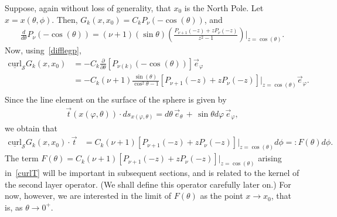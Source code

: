 \documentclass[final]{siamltex}
\newcommand{\C}{C_k}
\renewcommand{\S} {\mathcal{S}}
\begin{document}
Suppose, again without loss of generality, that $x_0$ is the North Pole.  Let 
$x=x(\theta,\phi)$. Then, $G_k(x,x_0) = \C P_\nu(-\cos(\theta))$, and
\begin{align}
  \label{difflegp} 
  \frac{d}{d\theta} P_\nu(-\cos(\theta)) =  
    (\nu+1)(\sin\theta) \left( \frac{ P_{\nu+1}(-z) +z
        P_{\nu}(-z)}{z^2-1} 
   \right)\vert_{z=\cos(\theta)}.
\end{align}
Now, using~\eqref{difflegp}, 
\begin{align*}
  \underline{\mbox{curl}}_{\S} G_k(x,x_0)&=-
  \C\frac{\partial}{\partial \theta} \left[P_{\nu(k)}(-\cos(\theta))
  \right] \vec{e}_\varphi \\
  &=-\C(\nu+1)\frac{\sin(\theta)}{\cos^2\theta -1} 
    \left[ P_{\nu+1}(-z) + 
   z 
    P_\nu(-z)\right]\vert_{z=\cos(\theta)} \vec{e}_\varphi. \\
\end{align*}
Since the line element on the surface of the sphere is given by
\begin{align*}
  \vec{t}(x(\varphi,\theta))\cdot ds_{x(\varphi,\theta)} = 
    d\theta\,\vec{e}_{\theta} \,+
    \, \sin\theta d\varphi \,\vec{e}_{\varphi}, 
\end{align*} 
we obtain that
\begin{align}
  \label{curlT}
  \underline{\mbox{curl}}_{\S} G_k(x,x_0)\cdot \vec{t} &= 
  \C (\nu+1)  \left[ P_{\nu+1}(-z) + 
  z P_\nu(-z)\right]\vert_{z=\cos(\theta)} d\phi =: F(\theta)d\phi.
\end{align}
The term $F(\theta)= \C (\nu+1)  \left[ P_{\nu+1}(-z) + 
  z P_\nu(-z)\right]\vert_{z=\cos(\theta)}$ arising in~\eqref{curlT} will be important in subsequent
sections, and is related to the kernel of the second layer operator. (We
shall define this operator carefully later on.) For now, however, we are
interested in the limit of $F(\theta)$ as the point
$x\rightarrow x_0$, that is, as $\theta \rightarrow 0^+$.  
\end{document}
